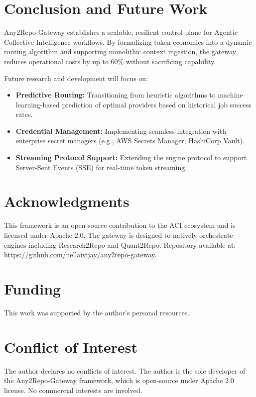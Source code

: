 \documentclass[10pt]{article}
\begin{document}
\section{Conclusion and Future Work}

Any2Repo-Gateway establishes a scalable, resilient control plane for Agentic Collective Intelligence workflows. By formalizing token economics into a dynamic routing algorithm and supporting monolithic context ingestion, the gateway reduces operational costs by up to 60\% without sacrificing capability.

Future research and development will focus on:

\begin{itemize}
    \item \textbf{Predictive Routing:} Transitioning from heuristic algorithms to machine learning-based prediction of optimal providers based on historical job success rates.
    \item \textbf{Credential Management:} Implementing seamless integration with enterprise secret managers (e.g., AWS Secrets Manager, HashiCorp Vault).
    \item \textbf{Streaming Protocol Support:} Extending the engine protocol to support Server-Sent Events (SSE) for real-time token streaming.
\end{itemize}

\section{Acknowledgments}

This framework is an open-source contribution to the ACI ecosystem and is licensed under Apache 2.0. The gateway is designed to natively orchestrate engines including Research2Repo and Quant2Repo. Repository available at: \url{https://github.com/nellaivijay/any2repo-gateway}.

\section*{Funding}

This work was supported by the author's personal resources.

\section*{Conflict of Interest}

The author declares no conflicts of interest. The author is the sole developer of the Any2Repo-Gateway framework, which is open-source under Apache 2.0 license. No commercial interests are involved.
\end{document}
